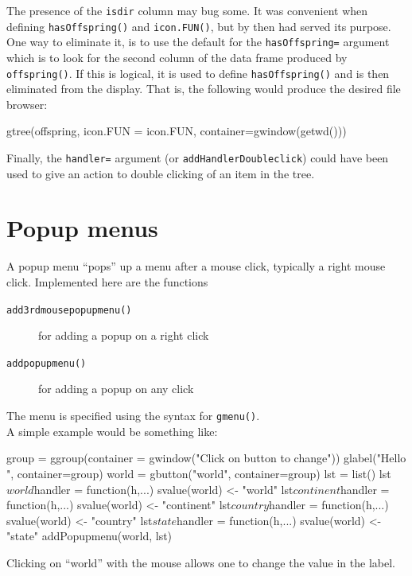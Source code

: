 \documentclass[12pt]{article}
\newcommand{\RCode}[1]{\texttt{#1}}
\newcommand{\RFunc}[1]{\texttt{#1()}}
\newcommand{\RArg}[1]{\texttt{#1=}}
\begin{document}
The presence of the \RCode{isdir} column may bug some. It was
convenient when defining \RFunc{hasOffspring} and \RFunc{icon.FUN},
but by then had served its purpose. One way to eliminate it, is to use
the default for the \RArg{hasOffspring} argument which is to look for
the second column of the data frame produced by \RFunc{offspring}. If
this is logical, it is used to define \RFunc{hasOffspring} and is then
eliminated from the display. That is, the following would produce the
desired file browser:

\begin{Scode}
  gtree(offspring,  icon.FUN = icon.FUN,
  container=gwindow(getwd()))
\end{Scode}

Finally, the  \RArg{handler} argument (or
\RCode{addHandlerDoubleclick}) could have been used to give an action to double
clicking of an item in the tree. 



\section{Popup menus}

A popup menu ``pops'' up a menu after a mouse click, typically a right
mouse click. Implemented here are the functions

\begin{description}
\item[\RFunc{add3rdmousepopupmenu}] for adding a popup on a right click
\item[\RFunc{addpopupmenu}] for adding a popup on any click
\end{description}

The menu is specified using the syntax for \RFunc{gmenu}.
\\


A simple example would be something like:

\begin{Scode}
  group = ggroup(container = gwindow("Click on button to change"))
  glabel("Hello ", container=group)
  world = gbutton("world", container=group)
  lst = list()
  lst$world$handler = function(h,...) svalue(world) <- "world"
  lst$continent$handler = function(h,...) svalue(world) <- "continent"
  lst$country$handler = function(h,...) svalue(world) <- "country"
  lst$state$handler = function(h,...) svalue(world) <- "state"
  addPopupmenu(world, lst)
\end{Scode}
Clicking on ``world'' with the mouse allows one to change the value in
the label.
\end{document}
